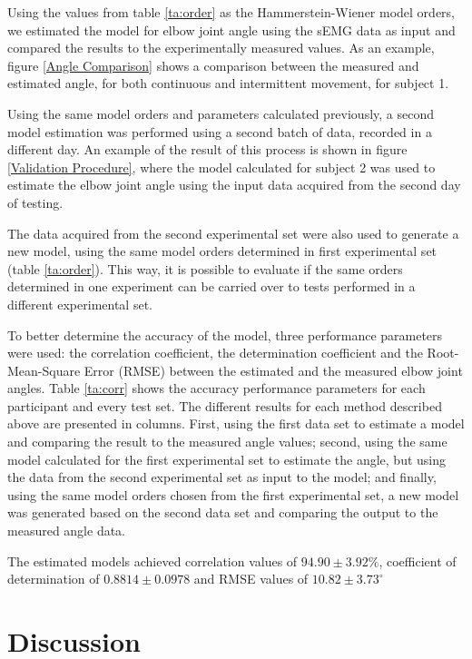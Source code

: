 \documentclass[letterpaper, 10 pt, conference]{ieeeconf}  %
\begin{document}
Using the values from table \ref{ta:order} as the Hammerstein-Wiener model orders, we estimated the model for elbow joint angle using the sEMG data as input and compared the results to the experimentally measured values. As an example, figure \ref{Angle Comparison} shows a comparison between the measured and estimated angle, for both continuous and intermittent movement, for subject 1.

Using the same model orders and parameters calculated previously, a second model estimation was performed using a second batch of data, recorded in a different day. An example of the result of this process is shown in figure \ref{Validation Procedure}, where the model calculated for subject 2 was used to estimate the elbow joint angle using the input data acquired from the second day of testing.

The data acquired from the second experimental set were also used to generate a new model, using the same model orders determined in first experimental set (table \ref{ta:order}). This way, it is possible to evaluate if the same orders determined in one experiment can be carried over to tests performed in a different experimental set.

   


To better determine the accuracy of the model, three performance parameters were used: the correlation coefficient, the determination coefficient and the Root-Mean-Square Error (RMSE) between the estimated and the measured elbow joint angles. Table \ref{ta:corr} shows the accuracy performance parameters for each participant and every test set. The different results for each method described above are presented in columns. First, using the first data set to estimate a model and comparing the result to the measured angle values; second, using the same model calculated for the first experimental set to estimate the angle, but using the data from the second experimental set as input to the model; and finally, using the same model orders chosen from the first experimental set, a new model was generated based on the second data set and comparing the output to the measured angle data.

The estimated models achieved correlation values of $94.90 \pm 3.92\%$, coefficient of determination of $0.8814 \pm 0.0978$ and RMSE values of $10.82 \pm 3.73^\circ$


\section{Discussion}
\end{document}
